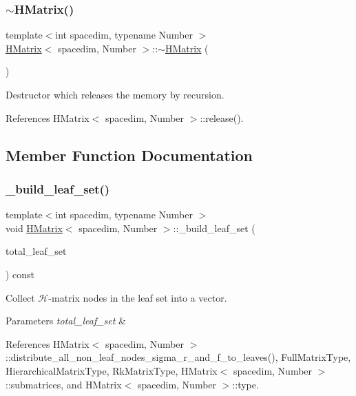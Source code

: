 \subsubsection{\texorpdfstring{$\sim$\+H\+Matrix()}{~HMatrix()}}
{\footnotesize\ttfamily template$<$int spacedim, typename Number $>$ \\
\hyperlink{classHMatrix}{H\+Matrix}$<$ spacedim, Number $>$\+::$\sim$\hyperlink{classHMatrix}{H\+Matrix} (\begin{DoxyParamCaption}{ }\end{DoxyParamCaption})}

Destructor which releases the memory by recursion. 

References H\+Matrix$<$ spacedim, Number $>$\+::release().



\subsection{Member Function Documentation}
\mbox{\label{classHMatrix_a60934e84cc3c9f6c75d011a2005f512a}} 
\subsubsection{\texorpdfstring{\+\_\+build\+\_\+leaf\+\_\+set()}{\_build\_leaf\_set()}}
{\footnotesize\ttfamily template$<$int spacedim, typename Number $>$ \\
void \hyperlink{classHMatrix}{H\+Matrix}$<$ spacedim, Number $>$\+::\+\_\+build\+\_\+leaf\+\_\+set (\begin{DoxyParamCaption}\item[{std\+::vector$<$ \hyperlink{classHMatrix}{H\+Matrix}$<$ spacedim, Number $>$ $\ast$$>$ \&}]{total\+\_\+leaf\+\_\+set }\end{DoxyParamCaption}) const\hspace{0.3cm}{\ttfamily [private]}}

Collect $\mathcal{H}$-\/matrix nodes in the leaf set into a vector. 
\begin{DoxyParams}{Parameters}
{\em total\+\_\+leaf\+\_\+set} & \\
\hline
\end{DoxyParams}


References H\+Matrix$<$ spacedim, Number $>$\+::distribute\+\_\+all\+\_\+non\+\_\+leaf\+\_\+nodes\+\_\+sigma\+\_\+r\+\_\+and\+\_\+f\+\_\+to\+\_\+leaves(), Full\+Matrix\+Type, Hierarchical\+Matrix\+Type, Rk\+Matrix\+Type, H\+Matrix$<$ spacedim, Number $>$\+::submatrices, and H\+Matrix$<$ spacedim, Number $>$\+::type.



